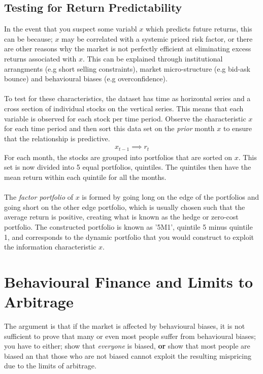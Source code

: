 \documentclass[a4paper]{article}
\begin{document}
\subsection{Testing for Return Predictability}
In the event that you suspect some variabl $x$ which predicts future returns,
this can be because; $x$ may be correlated with a systemic priced risk factor,
or there are other reasons why the market is not perfectly efficient at
eliminating excess returns associated with $x$. This can be explained through
institutional arrangments (e.g short selling constraints), market micro-structure
(e.g bid-ask bounce) and behavioural biases (e.g overconfidence).\\\\
%
To test for these characteristics, the dataset has time as horizontal series
and a cross section of individual stocks on the vertical series. This means
that each variable is observed for each stock per time period. Observe the
characteristic $x$ for each time period and then sort this data set on the
\emph{prior} month $x$ to ensure that the relationship is predictive.
\begin{align*}
x_{t-1} \implies r_t
\end{align*}
For each month, the stocks are grouped into portfolios that are sorted on $x$.
This set is now divided into 5 equal portfolios, quintiles. The quintiles
then have the mean return within each quintile for all the months.\\\\
%
%
The \emph{factor portfolio} of $x$ is formed by going long on the edge of the
portfolios and going short on the other edge portfolio, which is usually chosen
such that the average return is positive, creating what is known as the
hedge or zero-cost portfolio. The constructed portfolio is known as '5M1',
quintile 5 minus quintile 1, and corresponds to the dynamic portfolio
that you would construct to exploit the information characteristic $x$.

\section{Behavioural Finance and Limits to Arbitrage}
The argument is that if the market is affected by behavioural biases, it is not
sufficient to prove that many or even most people suffer from behavioural biases;
you have to either; show that \emph{everyone} is biased, \textbf{or} show that
most people are biased an that those who are not biased cannot exploit
the resulting mispricing due to the limits of arbitrage.
\end{document}
